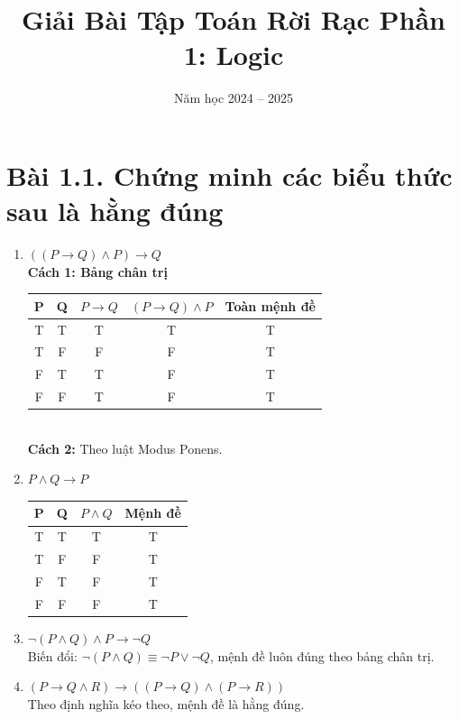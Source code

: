 \documentclass[12pt]{article}
\title{Giải Bài Tập Toán Rời Rạc \newline Phần 1: Logic}
\date{Năm học 2024 -- 2025}
\begin{document}
\maketitle

\section*{Bài 1.1. Chứng minh các biểu thức sau là hằng đúng}

\begin{enumerate}[label=\alph*)]
    \item \(((P \rightarrow Q) \land P) \rightarrow Q\)
    \\ \textbf{Cách 1: Bảng chân trị}\\
    \begin{tabular}{|c|c|c|c|c|}
        \hline
        P & Q & $P \rightarrow Q$ & $(P \rightarrow Q) \land P$ & Toàn mệnh đề \\
        \hline
        T & T & T & T & T \\
        T & F & F & F & T \\
        F & T & T & F & T \\
        F & F & T & F & T \\
        \hline
    \end{tabular}\\
    \textbf{Cách 2:} Theo luật Modus Ponens.

    \item $P \land Q \rightarrow P$\\
    \begin{tabular}{|c|c|c|c|}
        \hline
        P & Q & $P \land Q$ & Mệnh đề \\
        \hline
        T & T & T & T \\
        T & F & F & T \\
        F & T & F & T \\
        F & F & F & T \\
        \hline
    \end{tabular}

    \item $\neg(P \land Q) \land P \rightarrow \neg Q$\\
    Biến đổi: $\neg(P \land Q) \equiv \neg P \lor \neg Q$, mệnh đề luôn đúng theo bảng chân trị.

    \item $(P \rightarrow Q \land R) \rightarrow ((P \rightarrow Q) \land (P \rightarrow R))$\\
    Theo định nghĩa kéo theo, mệnh đề là hằng đúng.


\end{enumerate}
\end{document}
